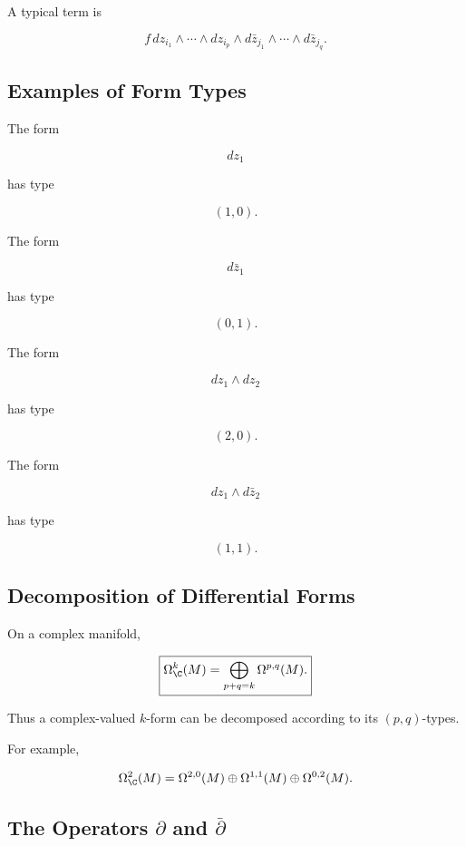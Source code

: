 A typical term is

\[
\boxed{
f\,
dz_{i_1}\wedge\cdots\wedge dz_{i_p}
\wedge
d\bar z_{j_1}\wedge\cdots\wedge d\bar z_{j_q}.
}
\]

\subsection{Examples of Form Types}
\label{subsec:examples-form-types}

The form

\[
dz_1
\]

has type

\[
\boxed{(1,0).}
\]

The form

\[
d\bar z_1
\]

has type

\[
\boxed{(0,1).}
\]

The form

\[
dz_1\wedge dz_2
\]

has type

\[
\boxed{(2,0).}
\]

The form

\[
dz_1\wedge d\bar z_2
\]

has type

\[
\boxed{(1,1).}
\]

\subsection{Decomposition of Differential Forms}
\label{subsec:complex-form-decomposition}

On a complex manifold,

\[
\boxed{
\Omega^k_{\C}(M)
=
\bigoplus_{p+q=k}
\Omega^{p,q}(M).
}
\]

Thus a complex-valued \(k\)-form can be decomposed according to its
\((p,q)\)-types.

For example,

\[
\Omega^2_{\C}(M)
=
\Omega^{2,0}(M)
\oplus
\Omega^{1,1}(M)
\oplus
\Omega^{0,2}(M).
\]

\subsection{The Operators \(\partial\) and \(\bar{\partial}\)}
\label{subsec:partial-barpartial}

